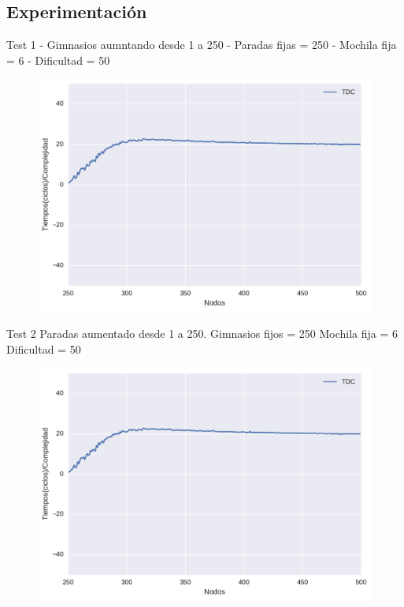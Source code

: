 \subsection{Experimentación}


Test 1 - 
Gimnasios aumntando desde 1 a 250 - 
Paradas fijas = 250 - 
Mochila fija = 6 - 
Dificultad = 50

\begin{figure}[H]
  \begin{center}
    \includegraphics[scale=0.8]{imagenes/ej2test1tiempos.pdf}
    \caption{}
    \label{}
  \end{center}
\end{figure}


Test 2
Paradas aumentado desde 1 a 250.
Gimnasios fijos = 250
Mochila fija = 6
Dificultad = 50

\begin{figure}[H]
  \begin{center}
    \includegraphics[scale=0.8]{imagenes/ej2test1tiempos.pdf}
    \caption{}
    \label{}
  \end{center}
\end{figure}


